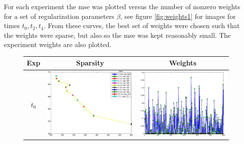 \documentclass[11pt]{article}
\begin{document}
{For each experiment the {\sf mse} was plotted versus the number of nonzero weights for a set of regularization parameters $\beta$, see figure \ref{fig:weights1} for images for times $t_0,t_2,t_4$. From these curves, the best set of weights were chosen such that the weights were sparse, but also so the {\sf mse} was kept reasonably small. The experiment weights are also plotted.  
\begin{figure}[!h]
	\renewcommand{\arraystretch}{1.5}
	\begin{center}
		\iwidth=80mm
		\begin{tabular}{|c|c|c|} %
			\hline		
			Exp & Sparsity & Weights	\\
			\hline	
			$t_0$
			&	
			\includegraphics[width=.8\iwidth]{figures/newFigs/exp1paretoWeights}
			&
			\includegraphics[width=.8\iwidth]{figures/newFigs/exp1Weights}\\

\end{tabular}
\end{center}
\end{figure}}
\end{document}
